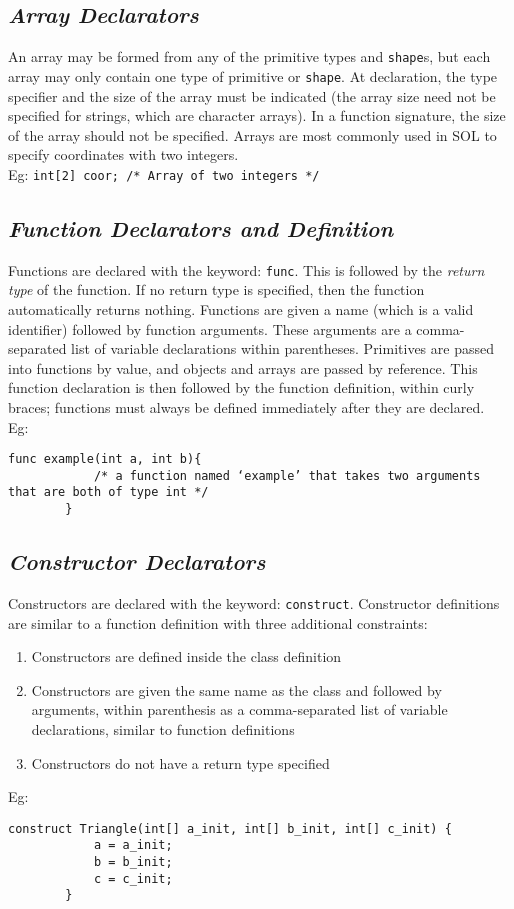 \documentclass[letterpaper,12pt]{article}
\begin{document}
	\subsection{\textit{Array Declarators}} \label{array}
    An array may be formed from any of the primitive types and \texttt{shape}s, but each array may only contain one type of primitive or \texttt{shape}. At declaration, the type specifier and the size of the array must be indicated (the array size need not be specified for strings, which are character arrays). In a function signature, the size of the array should not be specified. Arrays are most commonly used in SOL to specify coordinates with two integers.\\
    Eg: \texttt{int[2] coor; /* Array of two integers */}

    \subsection{\textit{Function Declarators and Definition}}
    Functions are declared with the keyword: \texttt{func}. This is followed by the \textit{return type} of the function. If no return type is specified, then the function automatically returns nothing. Functions are given a name (which is a valid identifier) followed by function arguments. These arguments are a comma-separated list of variable declarations within parentheses. Primitives are passed into functions by value, and objects and arrays are passed by reference. This function declaration is then followed by the function definition, within curly braces; functions must always be defined immediately after they are declared.\\
    Eg: \begin{lstlisting}[aboveskip=-13pt]
        func example(int a, int b){
            /* a function named ‘example’ that takes two arguments that are both of type int */
        }
    \end{lstlisting}

    \subsection{\textit{Constructor Declarators}}
    Constructors are declared with the keyword: \texttt{construct}. Constructor definitions are similar to a function definition with three additional constraints: 
    \begin{enumerate}
        \itemsep0em
        \item Constructors are defined inside the class definition
        \item Constructors are given the same name as the class and followed by arguments, within parenthesis as a comma-separated list of variable declarations, similar to function definitions
        \item Constructors do not have a return type specified
    \end{enumerate}
    Eg: \begin{lstlisting}[aboveskip=-13pt]
        construct Triangle(int[] a_init, int[] b_init, int[] c_init) {
            a = a_init;
            b = b_init;
            c = c_init;
        }
    \end{lstlisting}
\end{document}
